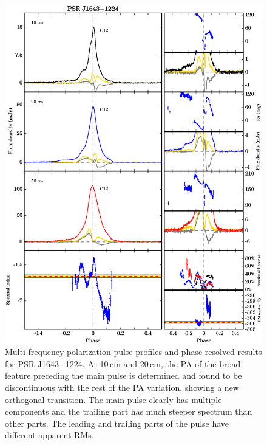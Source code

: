 \documentclass[useAMS,usenatbib]{mn2e}
\begin{document}
\begin{appendix}
\begin{figure}
\begin{center}
\includegraphics[width=6 in]{1643.ps}
\caption{Multi-frequency polarization pulse profiles and phase-resolved results for PSR J1643$-$1224. 
At 10\,cm and 20\,cm, the PA of the broad feature preceding the main pulse is determined and 
found to be discontinuous with the rest of the PA variation, showing 
a new orthogonal transition.
%
The main pulse clearly has multiple components and the trailing part has much 
steeper spectrum than other parts. The leading and trailing parts of the pulse 
have different apparent RMs.
}
\label{1643}
\end{center}
\end{figure}


\end{appendix}
\end{document}
